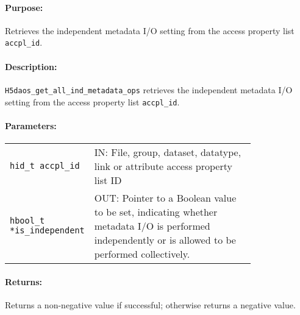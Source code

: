 \documentclass[../users_guide.tex]{subfiles}
\begin{document}
\paragraph{Purpose:}
\begin{flushleft}%
Retrieves the independent metadata I/O setting from the access property list \texttt{accpl\_id}.
\end{flushleft}%

\paragraph{Description:}
\begin{flushleft}%
\texttt{H5daos\_get\_all\_ind\_metadata\_ops} retrieves the independent metadata I/O setting
from the access property list \texttt{accpl\_id}.
\end{flushleft}%

\paragraph{Parameters:}
\begin{flushleft}%
 \begin{tabular}{lp{0.8\linewidth}}%
   \texttt{hid\_t accpl\_id} & IN: File, group, dataset, datatype, link or attribute access property list ID \\
   \texttt{hbool\_t *is\_independent} & OUT: Pointer to a Boolean value to be set, indicating whether metadata
   I/O is performed independently or is allowed to be performed collectively. \\
 \end{tabular}%
\end{flushleft}%

\paragraph{Returns:}
\begin{flushleft}%
Returns a non-negative value if successful; otherwise returns a negative value.
\end{flushleft}%
\end{document}
